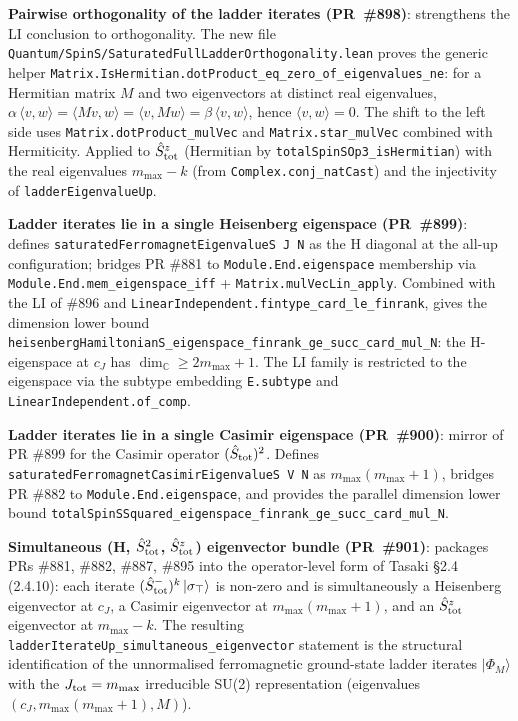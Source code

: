 \documentclass[a4paper,11pt]{article}
\begin{document}
\textbf{Pairwise orthogonality of the ladder iterates (PR~\#898)}:
strengthens the LI conclusion to orthogonality. The new file
\texttt{Quantum/SpinS/SaturatedFullLadderOrthogonality.lean}
proves the generic helper
\texttt{Matrix.IsHermitian.dotProduct\_eq\_zero\_of\_eigenvalues\_ne}:
for a Hermitian matrix $M$ and two eigenvectors at distinct real
eigenvalues, $\alpha\,\langle v,w\rangle = \langle Mv, w\rangle =
\langle v, Mw\rangle = \beta\,\langle v,w\rangle$, hence
$\langle v,w\rangle = 0$. The shift to the left side uses
\texttt{Matrix.dotProduct\_mulVec} and \texttt{Matrix.star\_mulVec}
combined with Hermiticity. Applied to $\hat S^z_{\rm tot}$
(Hermitian by \texttt{totalSpinSOp3\_isHermitian}) with the
real eigenvalues $m_{\max} - k$ (from \texttt{Complex.conj\_natCast})
and the injectivity of \texttt{ladderEigenvalueUp}.

\textbf{Ladder iterates lie in a single Heisenberg eigenspace
(PR~\#899)}: defines
\texttt{saturatedFerromagnetEigenvalueS J N} as the H diagonal
at the all-up configuration; bridges PR \#881 to
\texttt{Module.End.eigenspace} membership via
\texttt{Module.End.mem\_eigenspace\_iff} +
\texttt{Matrix.mulVecLin\_apply}. Combined with the LI of \#896
and \texttt{LinearIndependent.fintype\_card\_le\_finrank}, gives
the dimension lower bound
\texttt{heisenbergHamiltonianS\_eigenspace\_finrank\_ge\_succ\_card\_mul\_N}:
the H-eigenspace at $c_J$ has $\dim_{\mathbb{C}} \geq 2m_{\max}+1$.
The LI family is restricted to the eigenspace via the subtype
embedding \texttt{E.subtype} and
\texttt{LinearIndependent.of\_comp}.

\textbf{Ladder iterates lie in a single Casimir eigenspace
(PR~\#900)}: mirror of PR \#899 for the Casimir operator
$(\hat S_{\rm tot})^2$. Defines
\texttt{saturatedFerromagnetCasimirEigenvalueS V N} as
$m_{\max}(m_{\max}+1)$, bridges PR \#882 to
\texttt{Module.End.eigenspace}, and provides the parallel
dimension lower bound
\texttt{totalSpinSSquared\_eigenspace\_finrank\_ge\_succ\_card\_mul\_N}.

\textbf{Simultaneous (H, $\hat S_{\rm tot}^2$, $\hat S^z_{\rm tot}$)
eigenvector bundle (PR~\#901)}: packages PRs \#881, \#882, \#887,
\#895 into the operator-level form of Tasaki §2.4 (2.4.10):
each iterate $(\hat S^-_{\rm tot})^k\,|\sigma_\top\rangle$ is
non-zero and is simultaneously a Heisenberg eigenvector at
$c_J$, a Casimir eigenvector at $m_{\max}(m_{\max}+1)$, and an
$\hat S^z_{\rm tot}$ eigenvector at $m_{\max}-k$. The resulting
\texttt{ladderIterateUp\_simultaneous\_eigenvector} statement is
the structural identification of the unnormalised ferromagnetic
ground-state ladder iterates $|\Phi_M\rangle$ with the
$J_{\rm tot} = m_{\max}$ irreducible SU(2) representation
(eigenvalues $(c_J, m_{\max}(m_{\max}+1), M)$).
\end{document}
